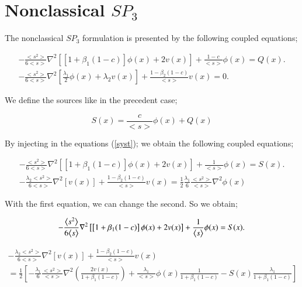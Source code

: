 \documentclass[preprint,12pt]{elsarticle}
\newcommand{\bl}{\big<}
\newcommand{\bg}{\big>}
\begin{document}
\section{Nonclassical $SP_3$}\label{sec5}
The nonclassical $SP_3$ formulation is presented by the following coupled equations;

\begin{align}\label{syst}
-\frac{\bl s^2 \bg}{6\bl s \bg} \nabla^2 \left[\left[1+\beta_1(1-c)\right]\phi(x)+ 2v(x)\right] + \frac{1-c}{\bl s \bg} \phi(x) = Q(x). \\
-\frac{\bl s^2 \bg}{6\bl s \bg} \nabla^2 \left[\frac{\lambda_1}{2}\phi(x)+ \lambda_2v(x)\right] + \frac{1-\beta_2(1-c)}{\bl s \bg} v(x) = 0. 
\end{align}

We define the sources like in the precedent case;

\begin{equation}
S(x) = \frac{c}{\bl s \bg} \phi(x) + Q(x)
\end{equation}

By injecting in the equations (\ref{syst}); we obtain the following coupled equations;

\begin{align}
-\frac{\bl s^2 \bg}{6\bl s \bg} \nabla^2 \left[\left[1+\beta_1(1-c)\right]\phi(x)+ 2v(x)\right] + \frac{1}{\bl s \bg} \phi(x) = S(x). \\
-\frac{\lambda_2 \bl s^2 \bg}{6\bl s \bg} \nabla^2 \left[v(x)\right] + \frac{1-\beta_2(1-c)}{\bl s \bg} v(x) = \frac{1}{2}\frac{\lambda_1}{6}\frac{\bl s^2 \bg}{\bl s \bg} \nabla^2 \phi(x)
\end{align}

With the first equation, we can change the second. So we obtain;

\begin{equation}
-\frac{\bl s^2 \bg}{6\bl s \bg} \nabla^2 \left[\left[1+\beta_1(1-c)\right]\phi(x)+ 2v(x)\right] + \frac{1}{\bl s \bg} \phi(x) = S(x). \\
\end{equation}

\begin{multline}
-\frac{\lambda_2 \bl s^2 \bg}{6\bl s \bg} \nabla^2 \left[v(x)\right] + \frac{1-\beta_2(1-c)}{\bl s \bg} v(x) \\= \frac{1}{2}\left[-\frac{\lambda_1}{6}\frac{\bl s^2 \bg}{\bl s \bg} \nabla^2\left(\frac{2v(x)}{1+\beta_1(1-c)}\right) + \frac{\lambda_1}{\bl s \bg}\phi(x)\frac{1}{1+\beta_1(1-c)}-S(x)\frac{\lambda_1}{1+\beta_1(1-c)}\right]
\end{multline}
\end{document}
